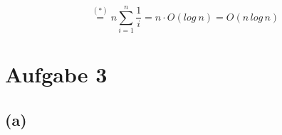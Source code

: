 \documentclass[11pt,a4paper,ngerman]{article}
\begin{document}
\[
\stackrel{(*)}{=}n\sum_{i=1}^{n}\frac{1}{i}=n\cdot O(log\: n)=O(n\, log\, n)
\]




\section*{Aufgabe 3}




\subsection*{(a)}
\end{document}
